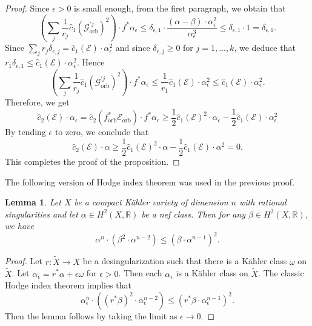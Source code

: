 \documentclass[12pt]{amsart}
\newcommand{\<}{\leq}
\def\>{\geq}
\def\mcE{\mathcal{E}}
\def\mcG{\mathcal{G}}
\newtheorem{lemma}[theorem]{Lemma}
\theoremstyle{remark}
\theoremstyle{definition}
\theoremstyle{definition}
\numberwithin{equation}{section}
\theoremstyle{definition}
\theoremstyle{definition}
\def\orb{\mathrm{orb}}
\begin{document}
\begin{proof}
Since $\epsilon>0$ is small enough, from the first paragraph, %
we obtain that 
\[
\left(\sum_j \frac{1}{r_j}\hat{c}_1(\mcG_{\orb}^{'j} )^2 \right)\cdot f^*\alpha_\epsilon 
\< \delta_{\epsilon,1} \cdot  \frac{ (\alpha - \beta) \cdot \alpha_\epsilon^{2} }{\alpha_\epsilon^3} 
\< \delta_{\epsilon, 1} \cdot 1  = \delta_{\epsilon,1}. 
\]
 Since  $ \sum_j r_j \delta_{\epsilon,j} =  \hat{c}_1(\mcE ) \cdot \alpha_\epsilon^2 $ and  since $\delta_{\epsilon,j} \> 0$ for $j=1,...,k$, we deduce that $ r_1 \delta_{\epsilon,1} \< \hat{c}_1(\mcE ) \cdot \alpha_\epsilon^2$. 
Hence 
\[
\left(\sum_j \frac{1}{r_j}\hat{c}_1(\mcG_{\orb}^{'j} )^2 \right)\cdot f^*\alpha_\epsilon 
\< \frac{1}{r_1} \hat{c}_1(\mcE) \cdot \alpha_\epsilon^{2}   
\< \hat{c}_1(\mcE) \cdot \alpha_\epsilon^{2}.
\]
Therefore, we get
\[
\hat{c}_2(\mcE) \cdot \alpha_\epsilon  
=
\hat{c}_2(f_{\orb}^*\mcE_{\orb}) \cdot f^*\alpha_\epsilon  
\> 
\frac{1}{2} \hat{c}_1(\mcE )^2 \cdot \alpha_\epsilon - \frac{1}{2} \hat{c}_1(\mcE ) \cdot \alpha_\epsilon^2 
\]
By tending $\epsilon$ to zero, we conclude that 
\[
\hat{c}_2(\mcE) \cdot \alpha  
\> 
\frac{1}{2}  \hat{c}_1(\mcE)^2 \cdot \alpha - \frac{1}{2 }\hat{c}_1(\mcE) \cdot \alpha^2  = 0.
\]
This completes the proof of the proposition. 
\end{proof}

The following version of Hodge index theorem was used in the previous proof.


\begin{lemma}
\label{lemma:hodge-index}
Let $X$ be a compact K\"ahler variety of dimension $n$ with rational singularities and let $\alpha \in H^2(X, \mathbb{R})$ be a nef class.
Then for any $\beta \in H^2(X, \mathbb{R})$, we have 
\[
\alpha^n \cdot (\beta^2 \cdot \alpha^{n-2}) \< ( \beta \cdot \alpha^{n-1} )^2.
\]
\end{lemma}

\begin{proof}
Let $r\colon \widetilde{X}  \to  X$ be a desingularization such that there is a K\"ahler class $\omega$ on $\widetilde{X}$.  
Let $\alpha_\epsilon = r^*\alpha+\epsilon \omega$ for $\epsilon >0$. 
Then each $\alpha_\epsilon$ is a K\"ahler class on $\widetilde{X}$. 
The classic Hodge index theorem implies that 
\[
\alpha_\epsilon^n \cdot ((r^*\beta)^2 \cdot \alpha_\epsilon^{n-2}) \< ( r^*\beta \cdot \alpha_\epsilon^{n-1} )^2.
\]
Then the lemma follows by taking the limit as $\epsilon\to 0$.
\end{proof}
\end{document}
